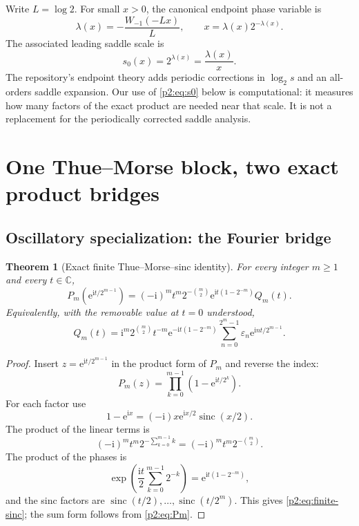 \documentclass[11pt,oneside]{article}
\numberwithin{equation}{section}
\newtheorem{theorem}{Theorem}[section]
\theoremstyle{definition}
\theoremstyle{remark}
\newcommand{\C}{\mathbb C}
\newcommand{\e}{\mathrm e}
\newcommand{\ii}{\mathrm i}
\newcommand{\sinc}{\operatorname{sinc}}
\newcommand{\eps}{\varepsilon}
\begin{document}
Write $L=\log2$.  For small $x>0$, the canonical endpoint phase variable is
\begin{equation}
 \lambda(x)=-\frac{W_{-1}(-Lx)}{L},
 \qquad x=\lambda(x)2^{-\lambda(x)}.
 \label{p2:eq:lambda}
\end{equation}
The associated leading saddle scale is
\begin{equation}
 s_0(x)=2^{\lambda(x)}=\frac{\lambda(x)}{x}.
 \label{p2:eq:s0}
\end{equation}
The repository's endpoint theory adds periodic corrections in $\log_2s$ and an all-orders
saddle expansion.  Our use of \eqref{p2:eq:s0} below is computational: it measures how many
factors of the exact product are needed near that scale.  It is not a replacement for the
periodically corrected saddle analysis.

\section{One Thue--Morse block, two exact product bridges}
\label{p2:sec:bridges}

\subsection{Oscillatory specialization: the Fourier bridge}

\begin{theorem}[Exact finite Thue--Morse--sinc identity]
\label{p2:thm:finite-sinc}
For every integer $m\ge1$ and every $t\in\C$,
\begin{equation}
 \boxed{
 P_m\!\left(\e^{\ii t/2^{m-1}}\right)
 =(-\ii)^m t^m 2^{-\binom m2}
   \e^{\ii t(1-2^{-m})}Q_m(t).}
 \label{p2:eq:finite-sinc}
\end{equation}
Equivalently, with the removable value at $t=0$ understood,
\begin{equation}
 \boxed{
 Q_m(t)=\ii^m2^{\binom m2}t^{-m}
 \e^{-\ii t(1-2^{-m})}
 \sum_{n=0}^{2^m-1}\eps_n\e^{\ii nt/2^{m-1}}.}
 \label{p2:eq:normalized-TM-Fourier}
\end{equation}
\newresult
\end{theorem}

\begin{proof}
Insert $z=\e^{\ii t/2^{m-1}}$ in the product form of $P_m$ and reverse the
index:
\[
 P_m(z)=\prod_{k=0}^{m-1}\left(1-\e^{\ii t/2^k}\right).
\]
For each factor use
\[
 1-\e^{\ii x}=(-\ii)x\e^{\ii x/2}\sinc(x/2).
\]
The product of the linear terms is
\[
 (-\ii)^m t^m2^{-\sum_{k=0}^{m-1}k}
 =(-\ii)^m t^m2^{-\binom m2}.
\]
The product of the phases is
\[
 \exp\!\left(\frac{\ii t}{2}\sum_{k=0}^{m-1}2^{-k}\right)
 =\e^{\ii t(1-2^{-m})},
\]
and the sinc factors are $\sinc(t/2),\ldots,\sinc(t/2^m)$.  This gives
\eqref{p2:eq:finite-sinc}; the sum form follows from \eqref{p2:eq:Pm}.
\end{proof}
\end{document}
